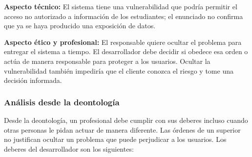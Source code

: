 \documentclass[12pt,a4paper,oneside]{article}
\begin{document}
\textbf{Aspecto técnico:} El sistema tiene una vulnerabilidad que podría permitir el acceso no autorizado a información de los estudiantes; el enunciado no confirma que ya se haya producido una exposición de datos.

\textbf{Aspecto ético y profesional:} El responsable quiere ocultar el problema para entregar el sistema a tiempo. El desarrollador debe decidir si obedece esa orden o actúa de manera responsable para proteger a los usuarios. Ocultar la vulnerabilidad también impediría que el cliente conozca el riesgo y tome una decisión informada.

\subsubsection{Análisis desde la deontología}

Desde la deontología, un profesional debe cumplir con sus deberes incluso cuando otras personas le pidan actuar de manera diferente. Las órdenes de un superior no justifican ocultar un problema que puede perjudicar a los usuarios. Los deberes del desarrollador son los siguientes:
\end{document}
